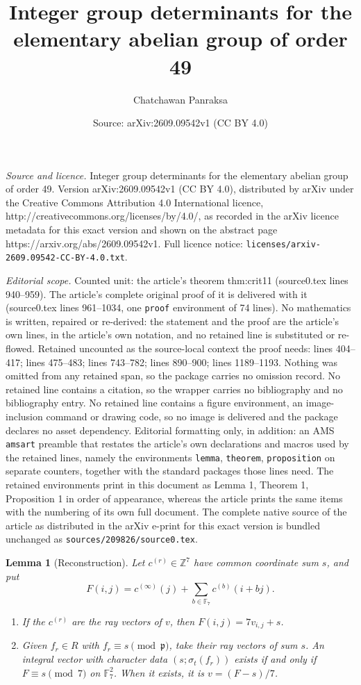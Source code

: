 \documentclass[10pt,a4paper]{amsart}
\title{Integer group determinants for the elementary abelian group of order 49}
\author{Chatchawan Panraksa}
\date{Source: arXiv:2609.09542v1 (CC BY 4.0)}
\newtheorem{lemma}{Lemma}
\newcommand{\F}{\mathbb F}
\newcommand{\Z}{\mathbb Z}
\newcommand{\pp}{\mathfrak p}
\begin{document}
\maketitle

\noindent\emph{Source and licence.} Integer group determinants for the elementary abelian group of order 49. Version arXiv:2609.09542v1 (CC BY 4.0), distributed by arXiv under the Creative Commons Attribution 4.0 International licence, http://creativecommons.org/licenses/by/4.0/, as recorded in the arXiv licence metadata for this exact version and shown on the abstract page https://arxiv.org/abs/2609.09542v1. Full licence notice: \texttt{licenses/arxiv-2609.09542-CC-BY-4.0.txt}.\par\smallskip

\noindent\textit{Editorial scope.} Counted unit: the article's theorem thm:crit11 (source0.tex lines 940--959). The article's complete original proof of it is delivered with it (source0.tex lines 961--1034, one \texttt{proof} environment of 74 lines). No mathematics is written, repaired or re-derived: the statement and the proof are the article's own lines, in the article's own notation, and no retained line is substituted or re-flowed.  Retained uncounted as the source-local context the proof needs: lines 404--417; lines 475--483; lines 743--782; lines 890--900; lines 1189--1193.  Nothing was omitted from any retained span, so the package carries no omission record.  No retained line contains a citation, so the wrapper carries no bibliography and no bibliography entry.  No retained line contains a figure environment, an image-inclusion command or drawing code, so no image is delivered and the package declares no asset dependency.  Editorial formatting only, in addition: an AMS \texttt{amsart} preamble that restates the article's own declarations and macros used by the retained lines, namely the environments \texttt{lemma}, \texttt{theorem}, \texttt{proposition} on separate counters, together with the standard packages those lines need.  The retained environments print in this document as Lemma 1, Theorem 1, Proposition 1 in order of appearance, whereas the article prints the same items with the numbering of its own full document.  The complete native source of the article as distributed in the arXiv e-print for this exact version is bundled unchanged as \texttt{sources/209826/source0.tex}.
\begin{lemma}[Reconstruction]\label{lem:interp}
Let $c^{(r)}\in\Z^7$ have common coordinate sum $s$, and put
\[
 F(i,j)=c^{(\infty)}(j)+\sum_{b\in\F_7}c^{(b)}(i+bj).
\]
\begin{enumerate}
\item[(i)] If the $c^{(r)}$ are the ray vectors of $v$, then
$F(i,j)=7v_{i,j}+s$.
\item[(ii)] Given $f_r\in R$ with $f_r\equiv s\pmod\pp$, take their
ray vectors of sum $s$. An integral vector with character data
$(s;\sigma_t(f_r))$ exists if and only if $F\equiv s\pmod7$ on
$\F_7^2$. When it exists, it is $v=(F-s)/7$.
\end{enumerate}
\end{lemma}
\end{document}

